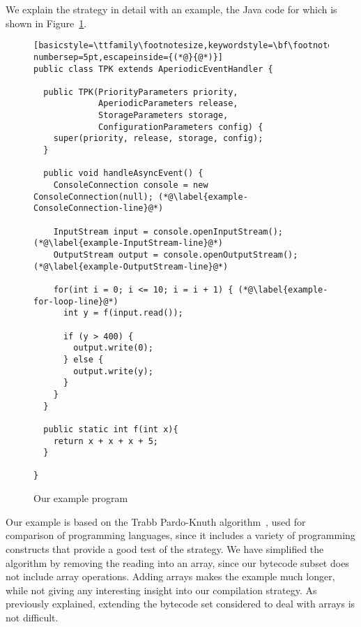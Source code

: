 We explain the strategy in detail with an example, the Java code for
which is shown in Figure~\ref{example-code-figure}.
\begin{figure}[tb!]
  \begin{center}
  \begin{minipage}{14cm}
  \begin{lstlisting}[basicstyle=\ttfamily\footnotesize,keywordstyle=\bf\footnotesize,language=Java,numbers=left,numberstyle=\tiny,stepnumber=1, numbersep=5pt,escapeinside={(*@}{@*)}]
public class TPK extends AperiodicEventHandler {

  public TPK(PriorityParameters priority,
             AperiodicParameters release,
             StorageParameters storage,
             ConfigurationParameters config) {
    super(priority, release, storage, config);
  }
      
  public void handleAsyncEvent() {
    ConsoleConnection console = new ConsoleConnection(null); (*@\label{example-ConsoleConnection-line}@*)
        
    InputStream input = console.openInputStream(); (*@\label{example-InputStream-line}@*)
    OutputStream output = console.openOutputStream(); (*@\label{example-OutputStream-line}@*)
        
    for(int i = 0; i <= 10; i = i + 1) { (*@\label{example-for-loop-line}@*)
      int y = f(input.read());
          
      if (y > 400) {
        output.write(0);
      } else {
        output.write(y);
      }
    }
  }
      
  public static int f(int x){
    return x + x + x + 5;
  }
      
}
\end{lstlisting}
\end{minipage}
\end{center}
  \caption{Our example program}
  \label{example-code-figure}
\end{figure}
Our example is based on the Trabb Pardo-Knuth
algorithm~\cite{knuth1980}, used for comparison of programming
languages, since it includes a variety of programming constructs that
provide a good test of the strategy.
We have simplified the algorithm by removing the reading into an
array, since our bytecode subset does not include array operations.
Adding arrays makes the example much longer, while not giving any
interesting insight into our compilation strategy.
As previously explained, extending the bytecode set considered to deal
with arrays is not difficult.

